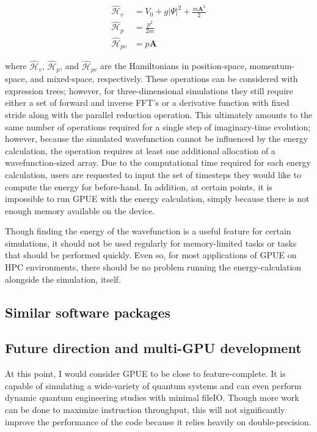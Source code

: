\begin{align}
\mathcal{\hat H}_v &= V_0 + g|\Psi|^2 + \frac{m\mathbf{A}^2}{2} \\
\mathcal{\hat H}_p &= \frac{p^2}{2m} \\
\mathcal{\hat H}_{pv} &= p\mathbf{A}
\end{align}

\noindent where $\mathcal{\hat H}_v$, $\mathcal{\hat H}_p$, and $\mathcal{\hat H}_{pv}$ are the Hamiltonians in position-space, momentum-space, and mixed-space, respectively.
These operations can be considered with expression trees; however, for three-dimensional simulations they still require either a set of forward and inverse FFT's or a derivative function with fixed stride along with the parallel reduction operation.
This ultimately amounts to the same number of operations required for a single step of imaginary-time evolution; however, because the simulated wavefunction cannot be influenced by the energy calculation, the operation requires at least one additional allocation of a wavefunction-sized array.
Due to the computational time required for each energy calculation, users are requested to input the set of timesteps they would like to compute the energy for before-hand.
In addition, at certain points, it is impossible to run GPUE with the energy calculation, simply because there is not enough memory available on the device.

Though finding the energy of the wavefunction is a useful feature for certain simulations, it should not be used regularly for memory-limited tasks or tasks that should be performed quickly.
Even so, for most applications of GPUE on HPC environments, there should be no problem running the energy-calculation alongside the simulation, itself.

\subsection{Similar software packages}

\subsection{Future direction and multi-GPU development}
\label{sec:multiGPU}

At this point, I would consider GPUE to be close to feature-complete.
It is capable of simulating a wide-variety of quantum systems and can even perform dynamic quantum engineering studies with minimal fileIO.
Though more work can be done to maximize instruction throughput, this will not significantly improve the performance of the code because it relies heavily on double-precision.

